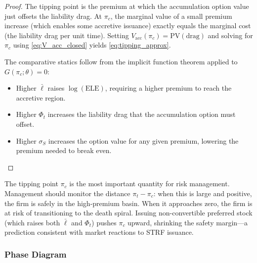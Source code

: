 \begin{proof}
The tipping point is the premium at which the accumulation option value
just offsets the liability drag.  At $\pi_c$, the marginal value of a small
premium increase (which enables some accretive issuance) exactly equals the
marginal cost (the liability drag per unit time).  Setting
$V_{\mathrm{acc}}(\pi_c) = \mathrm{PV}(\text{drag})$ and solving for
$\pi_c$ using \eqref{eq:V_acc_closed} yields \eqref{eq:tipping_approx}.

The comparative statics follow from the implicit function theorem applied
to $G(\pi_c; \theta) = 0$:
\begin{itemize}
  \item Higher $\bar\ell$ raises $\log(\mathrm{ELE})$, requiring a higher
    premium to reach the accretive region.
  \item Higher $\Phi_t$ increases the liability drag that the accumulation
    option must offset.
  \item Higher $\sigma_S$ increases the option value for any given premium,
    lowering the premium needed to break even.  \qedhere
\end{itemize}
\end{proof}

\begin{remark}
The tipping point $\pi_c$ is the most important quantity for risk management.
Management should monitor the distance $\pi_t - \pi_c$: when this is large
and positive, the firm is safely in the high-premium basin.  When it
approaches zero, the firm is at risk of transitioning to the death spiral.
Issuing non-convertible preferred stock (which raises both $\bar\ell$ and
$\Phi_t$) pushes $\pi_c$ upward, shrinking the safety margin---a prediction
consistent with market reactions to STRF issuance.
\end{remark}

\subsubsection{Phase Diagram}

